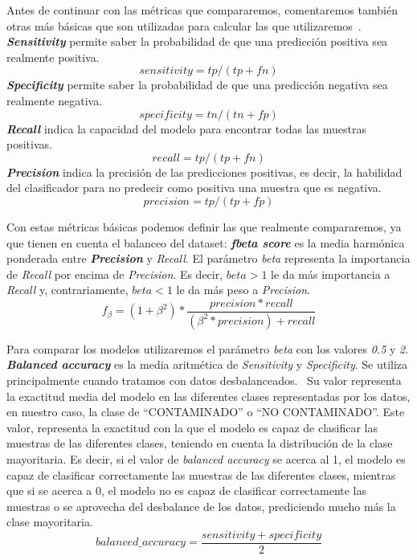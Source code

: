 Antes de continuar con las métricas que compararemos, comentaremos también otras más básicas que son utilizadas para calcular las que utilizaremos\ \cite{Precisio23:online}.
\\ \textit{\textbf{Sensitivity}} permite saber la probabilidad de que una predicción positiva sea realmente positiva.
    \begin{equation}
        sensitivity=tp/(tp+fn)
    \end{equation}
\textit{\textbf{Specificity}} permite saber la probabilidad de que una predicción negativa sea realmente negativa.
\begin{equation}
        specificity=tn/(tn+fp)
    \end{equation}
\textit{\textbf{Recall}} indica la capacidad del modelo para encontrar todas las muestras positivas. 
    \begin{equation}
        recall=tp/(tp+fn)
    \end{equation}
\textit{\textbf{Precision}} indica la precisión de las predicciones positivas, es decir, la habilidad del clasificador para no predecir como positiva una muestra que es negativa.
    \begin{equation}
        precision=tp/(tp+fp)
    \end{equation}

Con estas métricas básicas podemos definir las que realmente compararemos, ya que tienen en cuenta el balanceo del \gls{dataset}:
\textit{\textbf{fbeta score}} es la media harmónica ponderada entre \textit{\textbf{Precision}} y \textit{Recall}. 
El parámetro \textit{beta} representa la importancia de \textit{Recall} por encima de \textit{Precision}. 
Es decir, \(beta>1\) le da más importancia a \textit{Recall} y, contrariamente, \(beta<1\) le da más peso a \textit{Precision}.\ \cite{FscoreWi30:online}
    \begin{equation}
        f_\beta = (1 + \beta^2)*\frac{precision*recall}{(\beta^2*precision)+recall}
    \end{equation}

Para comparar los modelos utilizaremos el parámetro \textit{beta} con los valores \textit{0.5} y \textit{2}. 
\textit{\textbf{Balanced accuracy}} es la media aritmética de \textit{Sensitivity} y \textit{Specificity}. Se utiliza principalmente cuando tratamos con datos desbalanceados.\ \cite{Balanced44:online} Su valor representa la exactitud media del modelo en las diferentes clases representadas por los datos, en nuestro caso, la clase de ``CONTAMINADO'' o ``NO CONTAMINADO''. Este valor, representa la exactitud con la que el modelo es capaz de clasificar las muestras de las diferentes clases, teniendo en cuenta la distribución de la clase mayoritaria. Es decir, si el valor de \textit{balanced accuracy} se acerca al 1, el modelo es capaz de clasificar correctamente las muestras de las diferentes clases, mientras que si se acerca a 0, el modelo no es capaz de clasificar correctamente las muestras o se aprovecha del desbalance de los datos, prediciendo mucho más la clase mayoritaria.
\begin{equation}
    balanced\_accuracy =\frac{sensitivity + specificity}{2}
\end{equation}
